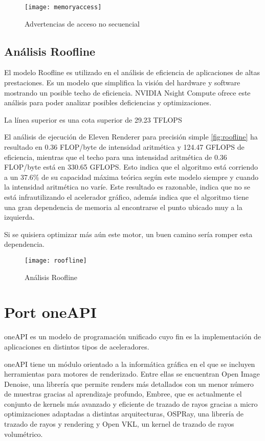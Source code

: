 \begin{figure}[H]
    \centering
	\texttt{[image: memoryaccess]}
	\caption{Advertencias de acceso no secuencial}
	\label{fig:label}
\end{figure}



\section{Análisis Roofline}
	
El modelo Roofline es utilizado en el análisis de eficiencia de aplicaciones de altas prestaciones. Es un modelo que simplifica la visión del hardware y software mostrando un posible techo de eficiencia. NVIDIA Nsight Compute ofrece este análisis para poder analizar posibles deficiencias y optimizaciones.

La línea superior es una cota superior de 29.23 TFLOPS

El análisis de ejecución de Eleven Renderer para precisión simple \autoref{fig:roofline} ha resultado en 0.36 FLOP/byte de intensidad aritmética y 124.47 GFLOPS de eficiencia, mientras que el techo para una intensidad aritmética de 0.36 FLOP/byte está en 330.65 GFLOPS. Esto indica que el algoritmo está corriendo a un 37.6\% de su capacidad máxima teórica según este modelo siempre y cuando la intensidad aritmética no varíe. Este resultado es razonable, indica que no se está infrautilizando el acelerador gráfico, además indica que el algoritmo tiene una gran dependencia de memoria al encontrarse el punto ubicado muy a la izquierda.

Si se quisiera optimizar más aún este motor, un buen camino sería romper esta dependencia.

\begin{figure}[H]
    \centering
	\texttt{[image: roofline]}
	\caption{Análisis Roofline}
	\label{fig:roofline}
\end{figure}

\chapter{Port oneAPI}
	
oneAPI es un modelo de programación unificado cuyo fin es la implementación de aplicaciones en distintos tipos de aceleradores. 


oneAPI tiene un módulo orientado a la informática gráfica en el que se incluyen herramientas para motores de renderizado. Entre ellas se encuentran Open Image Denoise, una librería que permite renders más detallados con un menor número de muestras gracias al aprendizaje profundo, Embree, que es actualmente el conjunto de kernels más avanzado y eficiente de trazado de rayos gracias a micro optimizaciones adaptadas a distintas arquitecturas, OSPRay, una librería de trazado de rayos y rendering y Open VKL, un kernel de trazado de rayos volumétrico.

